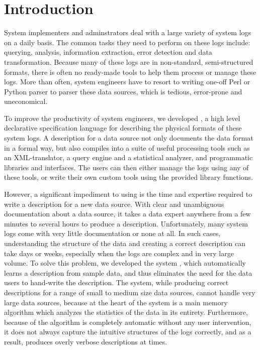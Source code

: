 \section{Introduction}
\label{sec:intro}

System implementers and adminstrators deal with a large variety of system logs on a
daily basis. The common tasks they need to perform on these logs include: querying,
analysis, information extraction, error detection and data transformation.
Because many of these logs are in non-standard, semi-structured formats,
there is often no ready-made tools to help them process or manage these logs.
More than often, system engineers have to resort to writing one-off
Perl or Python parser to parser these data sources, which is tedious,
error-prone and uneconomical. 

To improve the productivity of system engineers, we developed \pads
\cite{fisher+:pads,fisher+:popl06,mandelbaum+:pads-ml,padsweb},
a high level declarative specification language for describing the
physical formats of these system logs. A \pads{} description for a data
source not only documents the data format in a formal way, but also
compiles into a suite of useful processing tools such as an XML-translator,
a query engine and a statistical analyzer, and programmatic
libraries and interfaces. The users can then either manage the logs using
any of these tools, or write their own custom tools using the provided 
library functions. 

However, a significant impediment to using \pads{} is the time and 
expertise required to write a \pads{} description for a new data source.
With clear and unambiguous documentation about a data source, it takes a data 
expert anywhere from a few minutes to several hours to produce a description. 
Unfortunately, many system logs come with very little documentation or none at all.
In such cases, understanding the structure of the data and creating a correct
description can take days or weeks, especially when the logs are complex and in
very large volume. To solve this problem, we developed the \learnpads{} system
\cite{Fisher+:dirttoshovels,fisher+:sigmod08,xi08:tokenization}, which automatically
learns a \pads{} description from sample data, and thus eliminates the need
for the data users to hand-write the description. The \learnpads{} system,
while producing correct descriptions for a range of small to medium size data sources,
cannot handle very large data sources, because at the heart of the system is a
main memory algorithm which analyzes the statistics of the data in its entirety. 
Furthermore, because of the algorithm is completely automatic without any user
intervention, it does not always capture the intuitive structures of the logs
correctly, and as a result, produces overly verbose descriptions at times.

